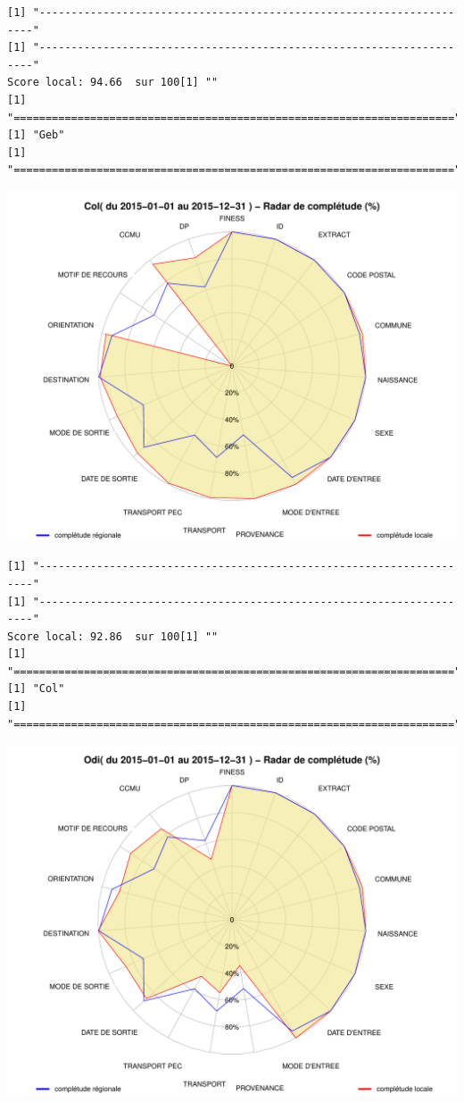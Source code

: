 \documentclass[]{article}
\begin{document}
\begin{verbatim}
[1] "---------------------------------------------------------------------"
[1] "---------------------------------------------------------------------"
Score local: 94.66  sur 100[1] ""
[1] "====================================================================="
[1] "Geb"
[1] "====================================================================="
\end{verbatim}

\includegraphics{completude_files/figure-latex/finess-12.pdf}

\begin{verbatim}
[1] "---------------------------------------------------------------------"
[1] "---------------------------------------------------------------------"
Score local: 92.86  sur 100[1] ""
[1] "====================================================================="
[1] "Col"
[1] "====================================================================="
\end{verbatim}

\includegraphics{completude_files/figure-latex/finess-13.pdf}
\end{document}
